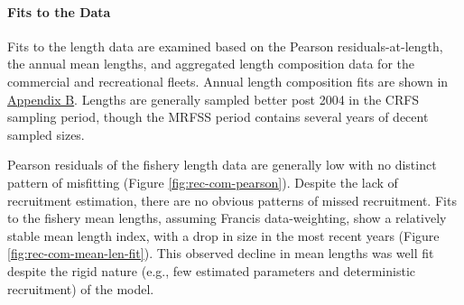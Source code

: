 \documentclass[11pt,
  english,
  a4paper,
]{article}
\begin{document}
\leavevmode\tagmcend\tagstructend\par


\hypertarget{fits-to-the-data}{%
\paragraph{Fits to the Data}\label{fits-to-the-data}}

\leavevmode\tagmcend\tagstructend


Fits to the length data are examined based on the Pearson residuals-at-length, the annual mean lengths, and aggregated length composition data for the commercial and recreational fleets. Annual length composition fits are shown in {\protect\hyperlink{append_a}{Appendix B}\leavevmode\tagmcend\tagstructend}. Lengths are generally sampled better post 2004 in the CRFS sampling period, though the MRFSS period contains several years of decent sampled sizes.

\leavevmode\tagmcend\tagstructend\par


Pearson residuals of the fishery length data are generally low with no distinct pattern of misfitting (Figure \ref{fig:rec-com-pearson}). Despite the lack of recruitment estimation, there are no obvious patterns of missed recruitment. Fits to the fishery mean lengths, assuming Francis data-weighting, show a relatively stable mean length index, with a drop in size in the most recent years (Figure \ref{fig:rec-com-mean-len-fit}). This observed decline in mean lengths was well fit despite the rigid nature (e.g., few estimated parameters and deterministic recruitment) of the model.

\leavevmode\tagmcend\tagstructend\par

\end{document}
